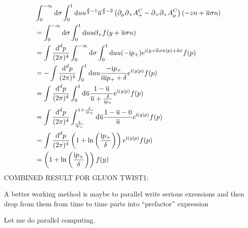 \begin{align}
	&\int_{0}^{-\infty} \text{d} \sigma \int_0^1 \text{d} u u^{\frac{d}{2}-1} \overline u^{\frac{d}{2}-2} \left(\partial_\mu \partial_+ A^C_+ - \partial_+\partial_+ A^C_\mu\right)(-zn+\overline u \sigma n)
	\\
	&=
	\int_{0}^{-\infty} \text{d} \sigma \int_0^1 \text{d} u u \partial_+ f(y+\overline u \sigma n)
	\\
	&=
	\int \frac{\text{d} ^d p}{(2\pi)^4}\int_{0}^{-\infty} \text{d} \sigma \int_0^1 \text{d} u u (-\text{i}p_{+}) e^{\text{i} (y+\overline u \sigma n|p)+\delta \sigma} f(p)
	\\
	&=
	-\int \frac{\text{d} ^d p}{(2\pi)^4} \int_0^1 \text{d} u u \frac{-\text{i}p_{+}}{\text{i} \overline u p_{+} + \delta} e^{\text{i} (y|p)} f(p)
	\\
	&=
	\int \frac{\text{d} ^d p}{(2\pi)^4}\int_0^1 \text{d} \overline u \frac{1-\overline u}{ \overline u + \frac{\delta}{\text{i}p_{+}}} e^{\text{i} (y|p)} f(p)
	\\
	&=
	\int \frac{\text{d} ^d p}{(2\pi)^4}\int_{\frac{\delta}{\text{i}p_{+}}}^{1+\frac{\delta}{\text{i}p_{+}}} \text{d} \overline u \frac{1-\overline u-0}{ \overline u } e^{\text{i} (y|p)} f(p)
	\\
	&=
	\int \frac{\text{d} ^d p}{(2\pi)^4}\left(1+\ln\left(\frac{\text{i}p_{+}}{\delta}\right)\right) e^{\text{i} (y|p)} f(p)
	\\
	&=
	\left(1+\ln\left(\frac{\text{i}p_{+}}{\delta}\right)\right) f(y)
\end{align}
COMBINED RESULT FOR GLUON TWIST1: 

A better working method is maybe to parallel write serious exressions and then drop from them from time to time parts into ``prefactor'' expression

Let me do parallel computing. 

